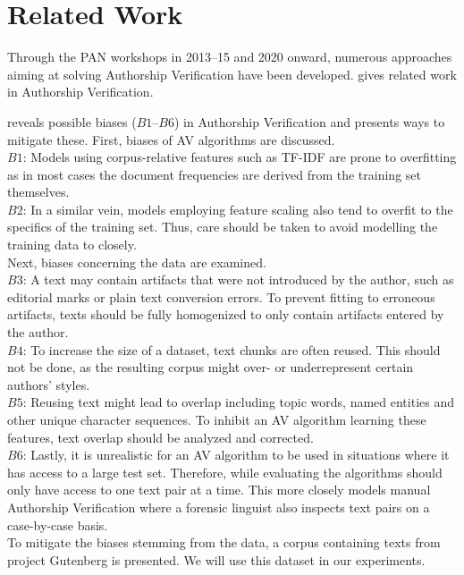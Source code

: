 \chapter{Related Work}\label{related_work}


Through the PAN workshops in 2013--15 and 2020 onward, numerous approaches aiming at solving Authorship Verification have been developed.
\cite{stein2019unbiasedGutenbergCorpus} gives related work in Authorship Verification.

\cite{stein2019unbiasedGutenbergCorpus} reveals possible biases ($B1$--$B6$) in Authorship Verification and presents ways to mitigate these.
First, biases of AV algorithms are discussed.\\
$B1$: Models using corpus-relative features such as TF-IDF are prone to overfitting as in most cases the document frequencies are derived from the training set themselves.\\
$B2$: In a similar vein, models employing feature scaling also tend to overfit to the specifics of the training set.
Thus, care should be taken to avoid modelling the training data to closely.\\
Next, biases concerning the data are examined.\\
$B3$: A text may contain artifacts that were not introduced by the author, such as editorial marks or plain text conversion errors.
To prevent fitting to erroneous artifacts, texts should be fully homogenized to only contain artifacts entered by the author.\\
$B4$: To increase the size of a dataset, text chunks are often reused.
This should not be done, as the resulting corpus might over- or underrepresent certain authors' styles.\\
$B5$: Reusing text might lead to overlap including topic words, named entities and other unique character sequences.
To inhibit an AV algorithm learning these features, text overlap should be analyzed and corrected.\\
$B6$: Lastly, it is unrealistic for an AV algorithm to be used in situations where it has access to a large test set.
Therefore, while evaluating the algorithms should only have access to one text pair at a time.
This more closely models manual Authorship Verification where a forensic linguist also inspects text pairs on a case-by-case basis.\\
To mitigate the biases stemming from the data, a corpus containing texts from project Gutenberg is presented.
We will use this dataset in our experiments.


